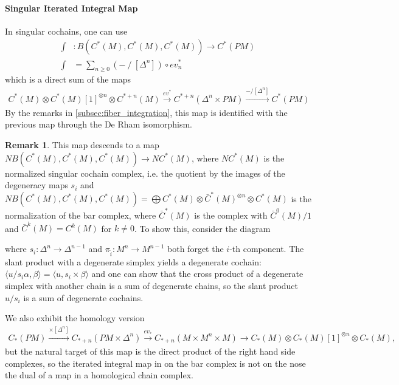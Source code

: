 \documentclass{scrartcl}
\theoremstyle{plain}
\theoremstyle{definition}
\newtheorem{remark}[theorem]{Remark}
\newcommand{\slant}{\mathbin{/}}
\let\xto\xrightarrow
\DeclareMathOperator{\id}{id}
\newcommand{\blank}{-}
\newcommand{\comp}{\mathbin{\circ}}
\begin{document}
\paragraph{Singular Iterated Integral Map} In singular cochains, one can use
\begin{align*}
    \int&\colon B(C^*(M), C^*(M), C^*(M)) \to C^*(PM) \\
    \int&= \sum_{n\geq 0} (\blank \slant [\Delta^n]) \comp ev_n^*
\end{align*}
which is a direct sum of the maps 
\begin{align*}
    C^*(M)\otimes C^*(M)[1]^{\otimes n} \otimes C^{*+n}(M) \xto{ev^*} C^{*+n}(\Delta^n\times PM) \xto{\blank / [\Delta^n]} C^{*}(PM)
\end{align*}
By the remarks in \ref{subsec:fiber_integration}, this map is identified with the previous map through the De Rham isomorphism.

\begin{remark}
    This map descends to a map $NB(C^*(M), C^*(M), C^*(M)) \to NC^*(M)$, where $NC^*(M)$ is the normalized singular cochain complex, i.e. the quotient by the images of the degeneracy maps $s_i$ and  $NB(C^*(M), C^*(M), C^*(M)) = \bigoplus C^*(M)\otimes \bar C^*(M)^{\otimes n}\otimes C^*(M)$ is the normalization of the bar complex, where $\bar C^*(M)$ is the complex with $\bar C^0(M) / 1$ and $\bar C^k(M) = C^k(M)$ for $k\neq 0$. To show this, consider the diagram


    where $s_i\colon\Delta^n\to\Delta^{n-1}$ and $\pi_{\hat i}\colon M^{n}\to M^{n-1}$ both forget the $i$-th component. The slant product with a degenerate simplex yields a degenerate cochain: $\langle u / s_i\alpha, \beta\rangle = \langle u,s_i\times\beta\rangle$ and one can show that the cross product of a degenerate simplex with another chain is a sum of degenerate chains, so the slant product $u/s_i$ is a sum of degenerate cochains. 
\end{remark}

We also exhibit the homology version
\begin{align*}
    C_*(PM) \xto{\times [\Delta^n]} C_{*+n}(PM\times \Delta^n) \xto{ev_*} C_{*+n}(M\times M^n\times M)\to C_*(M)\otimes C_{*}(M)[1]^{\otimes n}\otimes C_*(M),
\end{align*}
but the natural target of this map is the direct product of the right hand side complexes, so the iterated integral map in on the bar complex is not on the nose the dual of a map in a homological chain complex.
\end{document}

